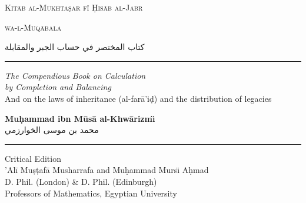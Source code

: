 \documentclass[11pt,a4paper]{book}
\newcommand{\ar}[1]{{\arabicfont\beginR #1\endR}}
\begin{document}
\begin{titlepage}
\begin{center}

\vspace*{1.5cm}

{\fontsize{32}{38}\selectfont\textcolor{titlecolor}{\textsc{Kit\=ab al-Mukhta\d{s}ar f\"{\i} \d{H}is\=ab al-Jabr}}}

\vspace{0.3cm}

{\fontsize{32}{38}\selectfont\textcolor{titlecolor}{\textsc{wa-l-Muq\=abala}}}

\vspace{0.8cm}

\begin{arabicbox}[width=0.85\textwidth,boxrule=0pt,colback=arabicbg]
\begin{center}
\Large
كتاب المختصر في حساب الجبر والمقابلة
\end{center}
\end{arabicbox}

\vspace{1cm}

\rule{0.5\textwidth}{1pt}

\vspace{1cm}

{\Large\textit{The Compendious Book on Calculation}}\\[0.2cm]
{\Large\textit{by Completion and Balancing}}\\[0.5cm]
{\normalsize And on the laws of inheritance (al-far\=a'i\d{d}) and the distribution of legacies}

\vspace{1.2cm}

{\LARGE\textbf{Mu\d{h}ammad ibn M\=us\=a al-Khw\=arizm\"{\i}}}\\[0.3cm]
{\Large\ar{محمد بن موسى الخوارزمي}}

\vspace{1cm}

\rule{0.3\textwidth}{0.5pt}

\vspace{0.8cm}

{\large Critical Edition}\\[0.2cm]
{\large 'Al\=i Mu\d{s}\d{t}af\=a Musharrafa and Mu\d{h}ammad Murs\"{\i} A\d{h}mad}\\[0.2cm]
{\normalsize D. Phil. (London) \& D. Phil. (Edinburgh)}\\[0.2cm]
{\normalsize Professors of Mathematics, Egyptian University}


\end{center}
\end{titlepage}
\end{document}
